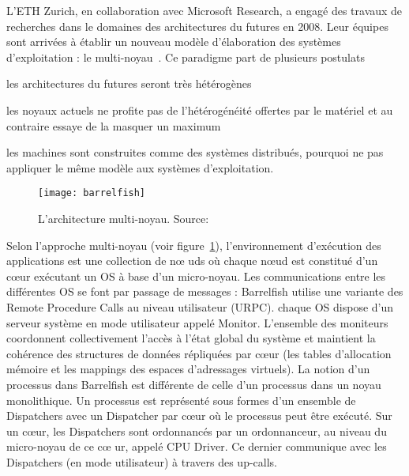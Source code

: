       L’ETH Zurich, en collaboration avec Microsoft Research, a engagé des
      travaux de recherches dans le domaines des architectures du futures en
      2008. Leur équipes sont arrivées à établir un nouveau modèle d’élaboration
      des systèmes d’exploitation : le
      multi-noyau~\citep{schupbach2008embracing}. Ce paradigme part de plusieurs
      postulats\benumline \item les architectures du futures seront très
      hétérogènes \item les noyaux actuels ne profite pas de l’hétérogénéité
      offertes par le matériel et au contraire essaye de la masquer un maximum
      \item les machines sont construites comme des systèmes distribués, pourquoi
        ne pas appliquer le même modèle aux systèmes d’exploitation\eenumline.

      \begin{figure}
        \centering
        \texttt{[image: barrelfish]}
        \caption{L'architecture multi-noyau. Source:
          \citeauthor{schupbach2008embracing}}
        \label{fig:barrelfish}
      \end{figure}
        
      Selon l’approche multi-noyau (voir figure~\ref{fig:barrelfish}),
      l'environnement d’exécution des applications est une collection de n\oe
      uds où chaque n\oe ud est constitué d’un c\oe ur exécutant un OS à base
      d’un micro-noyau. Les communications entre les différentes OS se font par
      passage de messages : Barrelfish utilise une variante des Remote Procedure
      Calls au niveau utilisateur (URPC). chaque OS dispose d’un serveur système
      en mode utilisateur appelé Monitor. L’ensemble des moniteurs coordonnent
      collectivement l’accès à l’état global du système et maintient la
      cohérence des structures de données répliquées par c\oe ur (les tables
      d’allocation mémoire et les mappings des espaces d’adressages
      virtuels). La notion d’un processus dans Barrelfish est différente de
      celle d’un processus dans un noyau monolithique. Un processus est
      représenté sous formes d’un ensemble de Dispatchers avec un Dispatcher par
      c\oe ur où le processus peut être exécuté. Sur un c\oe ur, les Dispatchers
      sont ordonnancés par un ordonnanceur, au niveau du micro-noyau de ce c\oe
      ur, appelé CPU Driver. Ce dernier communique avec les Dispatchers (en mode
      utilisateur) à travers des up-calls.\newline
      

